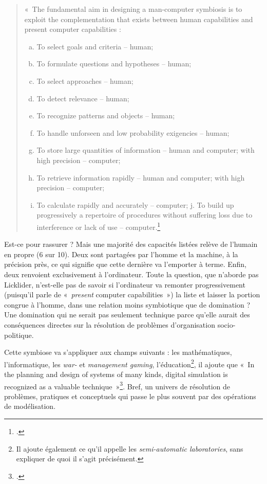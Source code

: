 \documentclass{FramateX}
\begin{document}
\begin{refsection}
\begin{quote}
«~The fundamental aim in designing a man-computer symbiosis is to exploit the complementation that exists between human capabilities and present computer capabilities :
\begin{enumerate}[(a)]
\item To select goals and criteria -- human;
\item To formulate questions and hypotheses -- human;
\item To select approaches -- human;
\item To detect relevance -- human;
\item To recognize patterns and objects -- human;
\item To handle unforseen and low probability exigencies -- human;
\item To store large quantities of information -- human and computer; with high precision -- computer;
\item To retrieve information rapidly -- human and computer; with high precision -- computer;
\item To calculate rapidly and accurately -- computer;
j. To build up progressively a repertoire of procedures without suffering loss due to interference or lack of use -- computer.\footnote{\cite[p.~114]{lickliderline1962}.}
\end{enumerate}
\end{quote}


Est-ce pour rassurer ? Mais une majorité des capacités listées relève de
l'humain en propre (6 sur 10). Deux sont partagées par l'homme et la
machine, à la précision près, ce qui signifie que cette dernière va
l'emporter à terme. Enfin, deux renvoient exclusivement à l'ordinateur.
Toute la question, que n'aborde pas Licklider, n'est-elle pas de savoir si
l'ordinateur va remonter progressivement (puisqu'il parle
de «~\textit{present} computer capabilities~») la liste et laisser la
portion congrue à l'homme, dans une relation moins symbiotique que de
domination ? Une domination qui ne serait pas seulement technique parce
qu'elle aurait des conséquences directes sur la résolution de problèmes
d'organisation socio-politique.

Cette symbiose va s'appliquer aux champs suivants : les mathématiques,
l'informatique, les \textit{war-} et \textit{management gaming},
l'éducation\footnote{Il ajoute également ce qu'il appelle les
\textit{semi-automatic laboratories}, sans expliquer de quoi il s'agit
précisément.}, il ajoute que «~In the planning and design of systems of
many kinds, digital simulation is recognized as a valuable technique~»\footnote{\cite[p.~114]{lickliderline1962}.}. Bref, un univers de résolution de problèmes, pratiques et
conceptuels qui passe le plus souvent par des opérations de
modélisation. 






\end{refsection}
\end{document}
